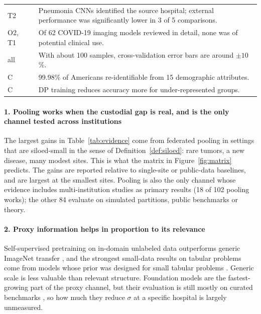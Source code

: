 \documentclass[acmsmall,screen,review]{acmart}
\theoremstyle{acmdefinition}
\begin{document}
\begin{table}[t]
\begin{tabularx}{\linewidth}{@{}p{1.15cm}>{\raggedright\arraybackslash}p{2.6cm}X@{}}
T2 & \citet{zech2018variable} & Pneumonia CNNs identified the source hospital; external performance was significantly lower in 3 of 5 comparisons.\\
O2, T1 & \citet{roberts2021common} & Of 62 COVID-19 imaging models reviewed in detail, none was of potential clinical use.\\
all & \citet{varoquaux2018cross} & With about 100 samples, cross-validation error bars are around $\pm 10$\%.\\
C & \citet{rocher2019estimating} & 99.98\% of Americans re-identifiable from 15 demographic attributes.\\
C & \citet{bagdasaryan2019differential} & DP training reduces accuracy more for under-represented groups.\\
\bottomrule
\end{tabularx}
\end{table}

\paragraph{1. Pooling works when the custodial gap is real, and is the only channel tested across institutions} The largest gains in Table~\ref{tab:evidence} come from federated pooling in settings that are siloed-small in the sense of Definition~\ref{def:siloed}: rare tumors, a new disease, many modest sites. This is what the matrix in Figure~\ref{fig:matrix} predicts. The gains are reported relative to single-site or public-data baselines, and are largest at the smallest sites. Pooling is also the only channel whose evidence includes multi-institution studies as primary results (18 of 102 pooling works); the other 84 evaluate on simulated partitions, public benchmarks or theory.

\paragraph{2. Proxy information helps in proportion to its relevance} Self-supervised pretraining on in-domain unlabeled data outperforms generic ImageNet transfer \cite{azizi2021big,raghu2019transfusion}, and the strongest small-data results on tabular problems come from models whose prior was designed for small tabular problems \cite{hollmann2025accurate}. Generic scale is less valuable than relevant structure. Foundation models are the fastest-growing part of the proxy channel, but their evaluation is still mostly on curated benchmarks \cite{wornow2023shaky}, so how much they reduce $\sigma$ at a specific hospital is largely unmeasured.
\end{document}
